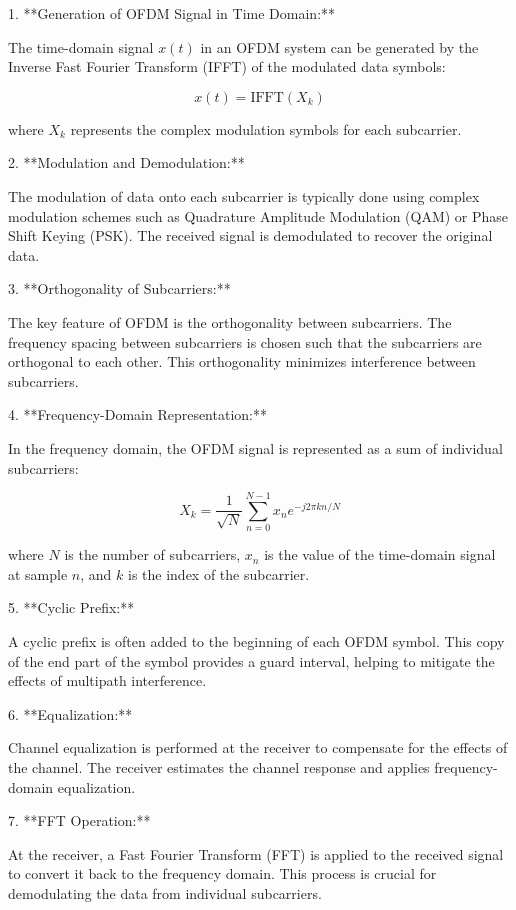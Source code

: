 \documentclass[colorlinks,11pt,a4paper,normalphoto,withhyper,ragged2e]{altareport}
\begin{document}
			1. **Generation of OFDM Signal in Time Domain:**
			
			The time-domain signal \(x(t)\) in an OFDM system can be generated by the Inverse Fast Fourier Transform (IFFT) of the modulated data symbols:
			
			\[ x(t) = \text{IFFT}\left(X_k\right) \]
			
			where \(X_k\) represents the complex modulation symbols for each subcarrier.
			
			2. **Modulation and Demodulation:**
			
			The modulation of data onto each subcarrier is typically done using complex modulation schemes such as Quadrature Amplitude Modulation (QAM) or Phase Shift Keying (PSK). The received signal is demodulated to recover the original data.
			
			3. **Orthogonality of Subcarriers:**
			
			The key feature of OFDM is the orthogonality between subcarriers. The frequency spacing between subcarriers is chosen such that the subcarriers are orthogonal to each other. This orthogonality minimizes interference between subcarriers.
			
			4. **Frequency-Domain Representation:**
			
			In the frequency domain, the OFDM signal is represented as a sum of individual subcarriers:
			
			\[ X_k = \frac{1}{\sqrt{N}} \sum_{n=0}^{N-1} x_n e^{-j2\pi k n / N} \]
			
			where \(N\) is the number of subcarriers, \(x_n\) is the value of the time-domain signal at sample \(n\), and \(k\) is the index of the subcarrier.
			
			5. **Cyclic Prefix:**
			
			A cyclic prefix is often added to the beginning of each OFDM symbol. This copy of the end part of the symbol provides a guard interval, helping to mitigate the effects of multipath interference.
			
			6. **Equalization:**
			
			Channel equalization is performed at the receiver to compensate for the effects of the channel. The receiver estimates the channel response and applies frequency-domain equalization.
			
			7. **FFT Operation:**
			
			At the receiver, a Fast Fourier Transform (FFT) is applied to the received signal to convert it back to the frequency domain. This process is crucial for demodulating the data from individual subcarriers.
			
\end{document}
